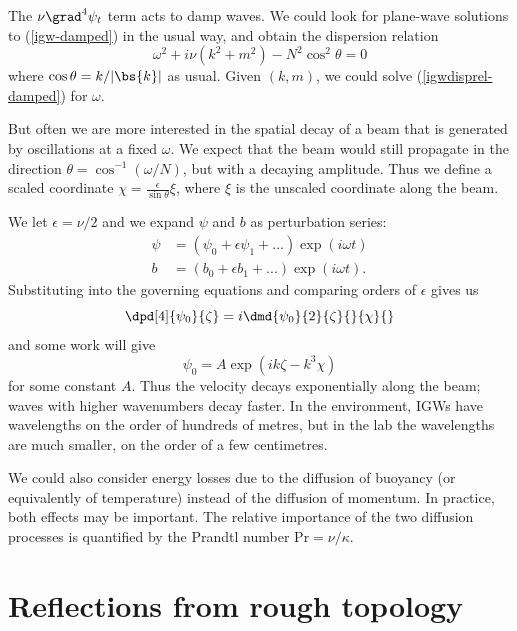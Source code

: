 The $\nu\grad^4\psi_t$ term acts to damp waves. We could look for plane-wave solutions to (\ref{igw-damped}) in the usual way, and obtain the dispersion relation
\begin{equation}
	\omega^2 + i\nu(k^2+m^2) - N^2\cos^2\theta = 0
	\label{igwdisprel-damped}
\end{equation}
where $\cos\theta = k/|\bs{k}|$ as usual. Given $(k,m)$, we could solve (\ref{igwdisprel-damped}) for $\omega$. 

But often we are more interested in the spatial decay of a beam that is
generated by oscillations at a fixed $\omega$. We expect that the beam would
still propagate in the direction $\theta = \cos^{-1} (\omega/N)$, but with a
decaying amplitude. Thus we define a scaled coordinate 
$\chi = \frac{\epsilon}{\sin\theta} \xi$, where $\xi$ is the unscaled coordinate
along the beam. 

We let $\epsilon = \nu/2$ and we expand $\psi$ and $b$ as perturbation series:
\begin{align}
    \psi &= (\psi_0 + \epsilon \psi_1 + ...)\exp(i\omega t) \\
    b &= (b_0 + \epsilon b_1 + ... ) \exp(i\omega t).
\end{align}
Substituting into the governing equations and comparing orders of $\epsilon$
gives us 
\begin{equation}
    \dpd[4]{\psi_0}{\zeta} = i\dmd{\psi_0}{2}{\zeta}{}{\chi}{}
\end{equation}
and some work will give 
\begin{equation}
    \psi_0 = A \exp(ik\zeta - k^3 \chi)
\end{equation}
for some constant $A$. Thus the velocity decays exponentially along the beam;
waves with higher wavenumbers decay faster. In the environment, IGWs have
wavelengths on the order of hundreds of metres, but in the lab the wavelengths
are much smaller, on the order of a few centimetres. 

We could also consider energy losses due to the diffusion of buoyancy (or
equivalently of temperature) instead of the diffusion of momentum. In practice,
both effects may be important. The relative importance of the two diffusion
processes is quantified by the Prandtl number $\mathrm{Pr} = \nu/\kappa$.

\section{Reflections from rough topology}

